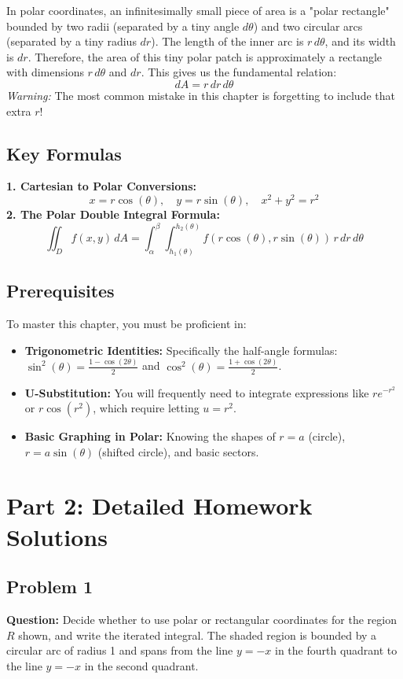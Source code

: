 \documentclass[12pt]{article}
\begin{document}
In polar coordinates, an infinitesimally small piece of area is a "polar rectangle" bounded by two radii (separated by a tiny angle $d\theta$) and two circular arcs (separated by a tiny radius $dr$). The length of the inner arc is $r \, d\theta$, and its width is $dr$. Therefore, the area of this tiny polar patch is approximately a rectangle with dimensions $r \, d\theta$ and $dr$. This gives us the fundamental relation:
\[ dA = r \, dr \, d\theta \]
\textit{Warning:} The most common mistake in this chapter is forgetting to include that extra $r$!

\subsection{Key Formulas}
\begin{tcolorbox}
\textbf{1. Cartesian to Polar Conversions:}
\[ x = r\cos(\theta), \quad y = r\sin(\theta), \quad x^2 + y^2 = r^2 \]
\textbf{2. The Polar Double Integral Formula:}
\[ \iint_D f(x,y) \, dA = \int_{\alpha}^{\beta} \int_{h_1(\theta)}^{h_2(\theta)} f(r\cos(\theta), r\sin(\theta)) \, r \, dr \, d\theta \]
\end{tcolorbox}

\subsection{Prerequisites}
To master this chapter, you must be proficient in:
\begin{itemize}
    \item \textbf{Trigonometric Identities:} Specifically the half-angle formulas: $\sin^2(\theta) = \frac{1 - \cos(2\theta)}{2}$ and $\cos^2(\theta) = \frac{1 + \cos(2\theta)}{2}$.
    \item \textbf{U-Substitution:} You will frequently need to integrate expressions like $r e^{-r^2}$ or $r\cos(r^2)$, which require letting $u = r^2$.
    \item \textbf{Basic Graphing in Polar:} Knowing the shapes of $r = a$ (circle), $r = a\sin(\theta)$ (shifted circle), and basic sectors.
\end{itemize}

\newpage
\section{Part 2: Detailed Homework Solutions}

\subsection*{Problem 1}
\textbf{Question:} Decide whether to use polar or rectangular coordinates for the region $R$ shown, and write the iterated integral. The shaded region is bounded by a circular arc of radius 1 and spans from the line $y = -x$ in the fourth quadrant to the line $y = -x$ in the second quadrant.
\end{document}
